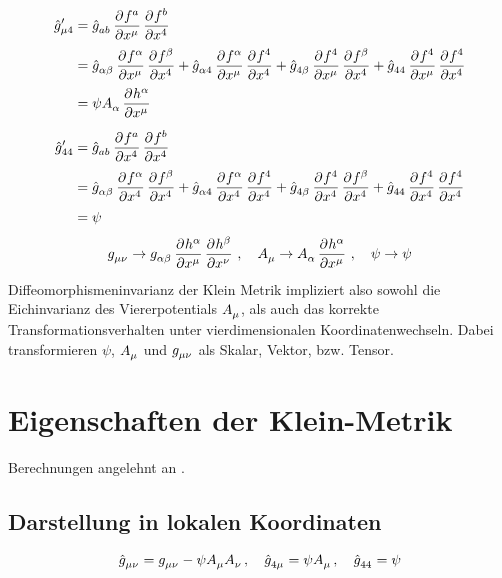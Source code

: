 \begin{equation}
\begin{split}
\tensor*{\hat{g}}{*^\prime_\mu_4}&=\tensor{\hat{g}}{_a_b}\dpd{f^a}{\tensor{x}{^\mu}}\dpd{f^b}{\tensor{x}{^4}}\\
&=\tensor{\hat{g}}{_\alpha_\beta}\dpd{f^\alpha}{\tensor{x}{^\mu}}\dpd{f^\beta}{\tensor{x}{^4}}
+\tensor{\hat{g}}{_\alpha_4}\dpd{f^\alpha}{\tensor{x}{^\mu}}\dpd{f^4}{\tensor{x}{^4}}
+\tensor{\hat{g}}{_4_\beta}\dpd{f^4}{\tensor{x}{^\mu}}\dpd{f^\beta}{\tensor{x}{^4}}
+\tensor{\hat{g}}{_4_4}\dpd{f^4}{\tensor{x}{^\mu}}\dpd{f^4}{\tensor{x}{^4}}\\
&=\psi\tensor{A}{_\alpha}\dpd{h^\alpha}{\tensor{x}{^\mu}}
\end{split}
\end{equation}
\begin{equation}
\begin{split}
\tensor*{\hat{g}}{*^\prime_4_4}&=\tensor{\hat{g}}{_a_b}\dpd{f^a}{\tensor{x}{^4}}\dpd{f^b}{\tensor{x}{^4}}\\
&=\tensor{\hat{g}}{_\alpha_\beta}\dpd{f^\alpha}{\tensor{x}{^4}}\dpd{f^\beta}{\tensor{x}{^4}}
+\tensor{\hat{g}}{_\alpha_4}\dpd{f^\alpha}{\tensor{x}{^4}}\dpd{f^4}{\tensor{x}{^4}}
+\tensor{\hat{g}}{_4_\beta}\dpd{f^4}{\tensor{x}{^4}}\dpd{f^\beta}{\tensor{x}{^4}}
+\tensor{\hat{g}}{_4_4}\dpd{f^4}{\tensor{x}{^4}}\dpd{f^4}{\tensor{x}{^4}}\\
&=\psi
\end{split}
\end{equation}
\begin{equation}
\tensor{g}{_\mu_\nu}\to\tensor{g}{_\alpha_\beta}\dpd{h^\alpha}{\tensor{x}{^\mu}}\dpd{h^\beta}{\tensor{x}{^\nu}}\,,\quad
\tensor{A}{_\mu}\to\tensor{A}{_\alpha}\dpd{h^\alpha}{\tensor{x}{^\mu}}\,,\quad
\psi\to\psi
\end{equation}
Diffeomorphismeninvarianz der Klein Metrik impliziert also sowohl die
Eichinvarianz des Viererpotentials $\tensor{A}{_\mu}$, als auch das korrekte
Transformationsverhalten unter vierdimensionalen Koordinatenwechseln.
Dabei transformieren $\psi$, $\tensor{A}{_\mu}$ und $\tensor{g}{_\mu_\nu}$ als
Skalar, Vektor, bzw. Tensor.
\section{Eigenschaften der Klein-Metrik}
Berechnungen angelehnt an \cite{Coquereaux:1990qs}
\cite{williams2015field}.
\subsection{Darstellung in lokalen Koordinaten}
\begin{equation}
\tensor{\hat{g}}{_\mu_\nu}=\tensor{g}{_\mu_\nu}-\psi\tensor{A}{_\mu}\tensor{A}{_\nu}\,,\quad
\tensor{\hat{g}}{_4_\mu}=\psi\tensor{A}{_\mu}\,,\quad
\tensor{\hat{g}}{_4_4}=\psi
\end{equation}
